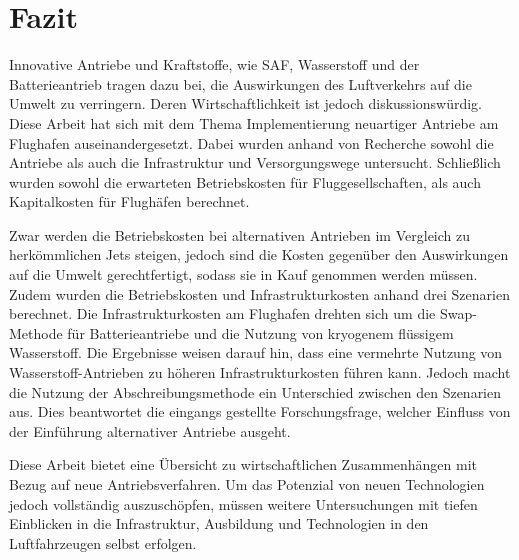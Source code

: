 \chapter{Fazit}
\label{ch:Fazit}
Innovative Antriebe und Kraftstoffe, wie SAF, Wasserstoff und der Batterieantrieb tragen dazu bei, die Auswirkungen des Luftverkehrs auf die Umwelt zu verringern.
Deren Wirtschaftlichkeit ist jedoch diskussionswürdig.
Diese Arbeit hat sich mit dem Thema Implementierung neuartiger Antriebe am Flughafen auseinandergesetzt. 
Dabei wurden anhand von Recherche sowohl die Antriebe als auch die Infrastruktur und Versorgungswege untersucht.
Schließlich wurden sowohl die erwarteten Betriebskosten für Fluggesellschaften, als auch Kapitalkosten für Flughäfen berechnet.

Zwar werden die Betriebskosten bei alternativen Antrieben im Vergleich zu herkömmlichen Jets steigen, 
jedoch sind die Kosten gegenüber den Auswirkungen auf die Umwelt gerechtfertigt, sodass sie in Kauf genommen werden müssen.
Zudem wurden die Betriebskosten und Infrastrukturkosten anhand drei Szenarien berechnet. 
Die Infrastrukturkosten am Flughafen drehten sich um die Swap-Methode für Batterieantriebe und die Nutzung von kryogenem flüssigem Wasserstoff.
Die Ergebnisse weisen darauf hin, dass eine vermehrte Nutzung von Wasserstoff-Antrieben zu höheren Infrastrukturkosten führen kann.
Jedoch macht die Nutzung der Abschreibungsmethode ein Unterschied zwischen den Szenarien aus. 
Dies beantwortet die eingangs gestellte Forschungsfrage, welcher Einfluss von der Einführung alternativer Antriebe ausgeht.

Diese Arbeit bietet eine Übersicht zu wirtschaftlichen Zusammenhängen mit Bezug auf neue Antriebsverfahren.
Um das Potenzial von neuen Technologien jedoch vollständig auszuschöpfen, müssen weitere Untersuchungen 
mit tiefen Einblicken in die Infrastruktur, Ausbildung und Technologien in den Luftfahrzeugen selbst erfolgen.
